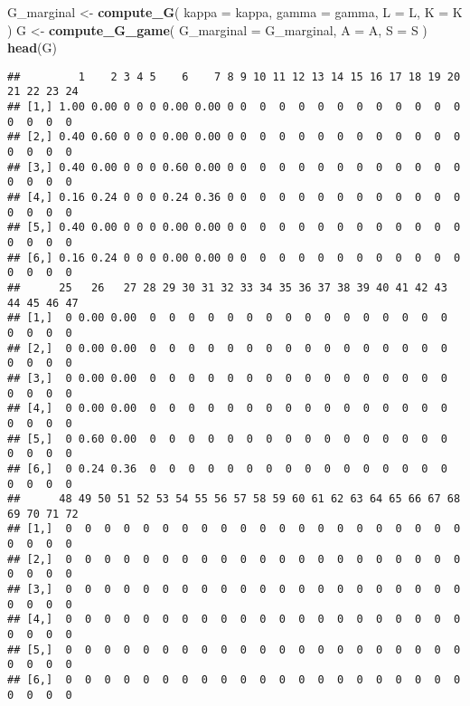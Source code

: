 \documentclass[
]{book}
\newenvironment{Shaded}{\begin{snugshade}}{\end{snugshade}}
\newcommand{\AttributeTok}[1]{\textcolor[rgb]{0.13,0.29,0.53}{#1}}
\newcommand{\FunctionTok}[1]{\textcolor[rgb]{0.13,0.29,0.53}{\textbf{#1}}}
\newcommand{\NormalTok}[1]{#1}
\newcommand{\OtherTok}[1]{\textcolor[rgb]{0.56,0.35,0.01}{#1}}
\begin{document}
\begin{Shaded}
\begin{Highlighting}[]
\NormalTok{G\_marginal }\OtherTok{\textless{}{-}} 
  \FunctionTok{compute\_G}\NormalTok{(}
    \AttributeTok{kappa =}\NormalTok{ kappa,}
    \AttributeTok{gamma =}\NormalTok{ gamma, }
    \AttributeTok{L =}\NormalTok{ L, }
    \AttributeTok{K =}\NormalTok{ K}
\NormalTok{    )}
\NormalTok{G }\OtherTok{\textless{}{-}} 
  \FunctionTok{compute\_G\_game}\NormalTok{(}
    \AttributeTok{G\_marginal =}\NormalTok{ G\_marginal, }
    \AttributeTok{A =}\NormalTok{ A, }
    \AttributeTok{S =}\NormalTok{ S}
\NormalTok{    )}
\FunctionTok{head}\NormalTok{(G)}
\end{Highlighting}
\end{Shaded}

\begin{verbatim}
##         1    2 3 4 5    6    7 8 9 10 11 12 13 14 15 16 17 18 19 20 21 22 23 24
## [1,] 1.00 0.00 0 0 0 0.00 0.00 0 0  0  0  0  0  0  0  0  0  0  0  0  0  0  0  0
## [2,] 0.40 0.60 0 0 0 0.00 0.00 0 0  0  0  0  0  0  0  0  0  0  0  0  0  0  0  0
## [3,] 0.40 0.00 0 0 0 0.60 0.00 0 0  0  0  0  0  0  0  0  0  0  0  0  0  0  0  0
## [4,] 0.16 0.24 0 0 0 0.24 0.36 0 0  0  0  0  0  0  0  0  0  0  0  0  0  0  0  0
## [5,] 0.40 0.00 0 0 0 0.00 0.00 0 0  0  0  0  0  0  0  0  0  0  0  0  0  0  0  0
## [6,] 0.16 0.24 0 0 0 0.00 0.00 0 0  0  0  0  0  0  0  0  0  0  0  0  0  0  0  0
##      25   26   27 28 29 30 31 32 33 34 35 36 37 38 39 40 41 42 43 44 45 46 47
## [1,]  0 0.00 0.00  0  0  0  0  0  0  0  0  0  0  0  0  0  0  0  0  0  0  0  0
## [2,]  0 0.00 0.00  0  0  0  0  0  0  0  0  0  0  0  0  0  0  0  0  0  0  0  0
## [3,]  0 0.00 0.00  0  0  0  0  0  0  0  0  0  0  0  0  0  0  0  0  0  0  0  0
## [4,]  0 0.00 0.00  0  0  0  0  0  0  0  0  0  0  0  0  0  0  0  0  0  0  0  0
## [5,]  0 0.60 0.00  0  0  0  0  0  0  0  0  0  0  0  0  0  0  0  0  0  0  0  0
## [6,]  0 0.24 0.36  0  0  0  0  0  0  0  0  0  0  0  0  0  0  0  0  0  0  0  0
##      48 49 50 51 52 53 54 55 56 57 58 59 60 61 62 63 64 65 66 67 68 69 70 71 72
## [1,]  0  0  0  0  0  0  0  0  0  0  0  0  0  0  0  0  0  0  0  0  0  0  0  0  0
## [2,]  0  0  0  0  0  0  0  0  0  0  0  0  0  0  0  0  0  0  0  0  0  0  0  0  0
## [3,]  0  0  0  0  0  0  0  0  0  0  0  0  0  0  0  0  0  0  0  0  0  0  0  0  0
## [4,]  0  0  0  0  0  0  0  0  0  0  0  0  0  0  0  0  0  0  0  0  0  0  0  0  0
## [5,]  0  0  0  0  0  0  0  0  0  0  0  0  0  0  0  0  0  0  0  0  0  0  0  0  0
## [6,]  0  0  0  0  0  0  0  0  0  0  0  0  0  0  0  0  0  0  0  0  0  0  0  0  0

\end{verbatim}
\end{document}
